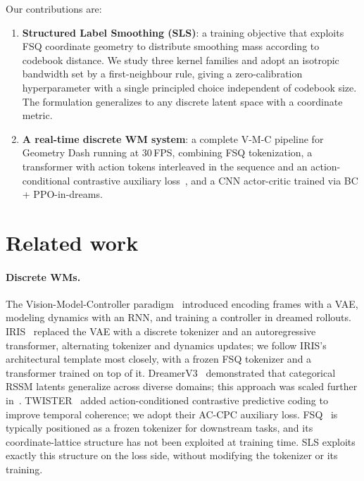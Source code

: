\documentclass{article}
\begin{document}
Our contributions are:
\begin{enumerate}
  \item \textbf{Structured Label Smoothing (SLS)}: a training objective that exploits FSQ coordinate geometry to distribute smoothing mass according to codebook distance. We study three kernel families and adopt an isotropic bandwidth set by a first-neighbour rule, giving a zero-calibration hyperparameter with a single principled choice independent of codebook size. The formulation generalizes to any discrete latent space with a coordinate metric.
  \item \textbf{A real-time discrete WM system}: a complete V-M-C pipeline for Geometry Dash running at 30\,FPS, combining FSQ tokenization, a transformer with action tokens interleaved in the sequence and an action-conditional contrastive auxiliary loss~\citep{burchi2025twister}, and a CNN actor-critic trained via BC + PPO-in-dreams.
\end{enumerate}

\section{Related work}
\label{sec:related}

\paragraph{Discrete WMs.}
The Vision-Model-Controller paradigm~\citep{ha2018world} introduced encoding frames with a VAE, modeling dynamics with an RNN, and training a controller in dreamed rollouts.
IRIS~\citep{micheli2023iris} replaced the VAE with a discrete tokenizer and an autoregressive transformer, alternating tokenizer and dynamics updates; we follow IRIS's architectural template most closely, with a frozen FSQ tokenizer and a transformer trained on top of it.
DreamerV3~\citep{hafner2025dreamerv3} demonstrated that categorical RSSM latents generalize across diverse domains; this approach was scaled further in~\citep{hafner2025dreamer4}.
TWISTER~\citep{burchi2025twister} added action-conditioned contrastive predictive coding to improve temporal coherence; we adopt their AC-CPC auxiliary loss.
FSQ~\citep{mentzer2024fsq} is typically positioned as a frozen tokenizer for downstream tasks, and its coordinate-lattice structure has not been exploited at training time. SLS exploits exactly this structure on the loss side, without modifying the tokenizer or its training.
\end{document}
